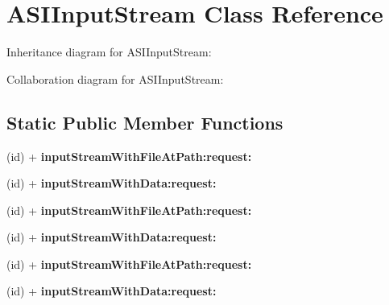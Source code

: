 \hypertarget{interface_a_s_i_input_stream}{
\section{\-A\-S\-I\-Input\-Stream \-Class \-Reference}
\label{interface_a_s_i_input_stream}
}


\-Inheritance diagram for \-A\-S\-I\-Input\-Stream\-:


\-Collaboration diagram for \-A\-S\-I\-Input\-Stream\-:
\subsection*{\-Static \-Public \-Member \-Functions}
\begin{DoxyCompactItemize}
\item 
\hypertarget{interface_a_s_i_input_stream_a1035f560fa6ddef148455388de269472}{
(id) + {\bfseries input\-Stream\-With\-File\-At\-Path\-:request\-:}}
\label{interface_a_s_i_input_stream_a1035f560fa6ddef148455388de269472}

\item 
\hypertarget{interface_a_s_i_input_stream_a3c83c62eb777c3bc0920a18f552cc4b9}{
(id) + {\bfseries input\-Stream\-With\-Data\-:request\-:}}
\label{interface_a_s_i_input_stream_a3c83c62eb777c3bc0920a18f552cc4b9}

\item 
\hypertarget{interface_a_s_i_input_stream_a1035f560fa6ddef148455388de269472}{
(id) + {\bfseries input\-Stream\-With\-File\-At\-Path\-:request\-:}}
\label{interface_a_s_i_input_stream_a1035f560fa6ddef148455388de269472}

\item 
\hypertarget{interface_a_s_i_input_stream_a3c83c62eb777c3bc0920a18f552cc4b9}{
(id) + {\bfseries input\-Stream\-With\-Data\-:request\-:}}
\label{interface_a_s_i_input_stream_a3c83c62eb777c3bc0920a18f552cc4b9}

\item 
\hypertarget{interface_a_s_i_input_stream_a1035f560fa6ddef148455388de269472}{
(id) + {\bfseries input\-Stream\-With\-File\-At\-Path\-:request\-:}}
\label{interface_a_s_i_input_stream_a1035f560fa6ddef148455388de269472}

\item 
\hypertarget{interface_a_s_i_input_stream_a3c83c62eb777c3bc0920a18f552cc4b9}{
(id) + {\bfseries input\-Stream\-With\-Data\-:request\-:}}
\label{interface_a_s_i_input_stream_a3c83c62eb777c3bc0920a18f552cc4b9}


\end{DoxyCompactItemize}
